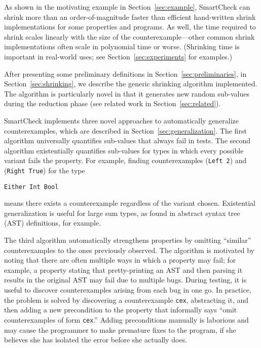 \documentclass{sigplanconf}
\newenvironment{code}{\begin{alltt}}{\end{alltt}}
\newcommand{\ttp}[1]{\texttt{#1}}
\begin{document}
As shown in the motivating example in Section~\ref{sec:example}, SmartCheck
can shrink more than an order-of-magnitude faster than efficient hand-written
shrink implementations for some properties and programs.  As well, the time
required to shrink scales linearly with the size of the counterexample---other
common shrink implementations often scale in polynomial time or worse.
(Shrinking time is important in real-world uses; see
Section~\ref{sec:experiments} for examples.)

After presenting some preliminary definitions in
Section~\ref{sec:preliminaries}, in Section~\ref{sec:shrinking}, we describe the
generic shrinking algorithm implemented.  The algorithm is particularly novel in
that it generates new random sub-values during the reduction phase (see related
work in Section~\ref{sec:related}).



SmartCheck implements three novel approaches to automatically generalize
counterexamples, which are described in Section~\ref{sec:generalization}.  The
first algorithm universally quantifies sub-values that always fail in tests.
The second algorithm existentially quantifies sub-values for types in which
every possible variant fails the property.  For example, finding counterexamples
(\ttp{Left 2}) and (\ttp{Right True}) for the type
%
\begin{code}
\ttp{Either Int Bool}
\end{code}
%
\noindent
means there exists a counterexample regardless of the variant chosen.
Existential generalization is useful for large sum types, as found in
abstract syntax tree (AST) definitions, for example.

The third algorithm automatically strengthens properties by omitting ``similar''
counterexamples to the ones previously observed.  The algorithm is motivated by
noting that there are often multiple ways in which a property may fail; for
example, a property stating that pretty-printing an AST and then parsing it
results in the original AST may fail due to multiple bugs.  During testing, it
is useful to discover counterexamples arising from each bug in one go.  In
practice, the problem is solved by discovering a counterexample \ttp{cex},
abstracting it, and then adding a new precondition to the property that
informally says ``omit counterexamples of form \ttp{cex}.''  Adding
preconditions manually is laborious and may cause the programmer to make
premature fixes to the program, if she believes she has isolated the error
before she actually does.
\end{document}
